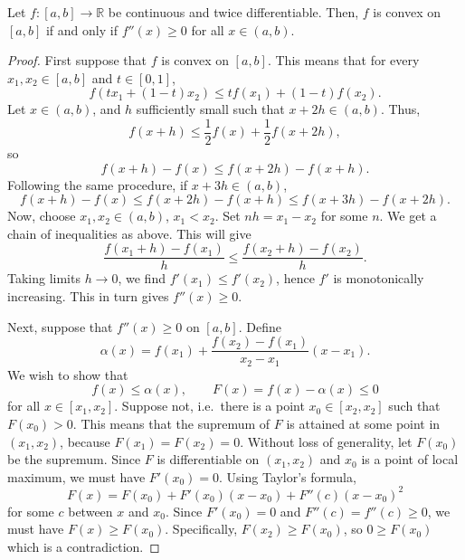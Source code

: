 \documentclass[11pt]{article}
\def\R{\mathbb{R}}
\theoremstyle{definition}
\theoremstyle{remark}
\numberwithin{equation}{module}
\begin{document}
    \begin{theorem}
        Let $f\colon [a, b] \to \R$ be continuous and twice differentiable. 
        Then, $f$ is convex on $[a, b]$ if and only if $f''(x) \geq 0$ for all $x
        \in (a, b)$.
    \end{theorem}
    \begin{proof}
        First suppose that $f$ is convex on $[a, b]$. This means that for every
        $x_1, x_2 \in [a, b]$ and $t \in [0, 1]$, \[
            f(tx_1 + (1 - t)x_2) \leq tf(x_1) + (1 - t)f(x_2).
        \] Let $x \in (a, b)$, and $h$ sufficiently small such that $x + 2h \in (a,
        b)$. Thus, \[
            f(x + h) \leq \frac{1}{2}f(x) + \frac{1}{2}f(x + 2h),
        \] so \[
            f(x + h) - f(x) \leq f(x + 2h) - f(x + h).
        \] Following the same procedure, if $x + 3h \in (a, b)$, \[
            f(x + h) - f(x) \leq f(x + 2h) - f(x + h) \leq f(x + 3h) - f(x + 2h).
        \] Now, choose $x_1, x_2 \in (a, b)$, $x_1 < x_2$. Set $nh = x_1 - x_2$ for
        some $n$. We get a chain of inequalities as above. This will give \[
            \frac{f(x_1 + h) - f(x_1)}{h} \leq \frac{f(x_2 + h) - f(x_2)}{h}.
        \] Taking limits $h \to 0$, we find $f'(x_1) \leq f'(x_2)$, hence $f'$ is
        monotonically increasing. This in turn gives $f''(x) \geq 0$.

        Next, suppose that $f''(x) \geq 0$ on $[a, b]$. Define \[
            \alpha(x) = f(x_1) + \frac{f(x_2) - f(x_1)}{x_2 - x_1}(x - x_1).
        \] We wish to show that \[
            f(x) \leq \alpha(x), \qquad F(x) = f(x) - \alpha(x) \leq 0
        \] for all $x \in [x_1, x_2]$. Suppose not, i.e.\ there is a point $x_0 \in
        [x_2, x_2]$ such that $F(x_0) > 0$. This means that the supremum of $F$ is
        attained at some point in $(x_1, x_2)$, because $F(x_1) = F(x_2) = 0$.
        Without loss of generality, let $F(x_0)$ be the supremum. Since $F$ is
        differentiable on $(x_1, x_2)$ and $x_0$ is a point of local maximum, we
        must have $F'(x_0) = 0$. Using Taylor's formula, \[
            F(x) = F(x_0) + F'(x_0)(x - x_0) + F''(c)(x - x_0)^2
        \] for some $c$ between $x$ and $x_0$. Since $F'(x_0) = 0$ and $F''(c) =
        f''(c) \geq 0$, we must have $F(x) \geq F(x_0)$. Specifically, $F(x_2) \geq
        F(x_0)$, so $0 \geq F(x_0)$ which is a contradiction.
    \end{proof}
\end{document}
